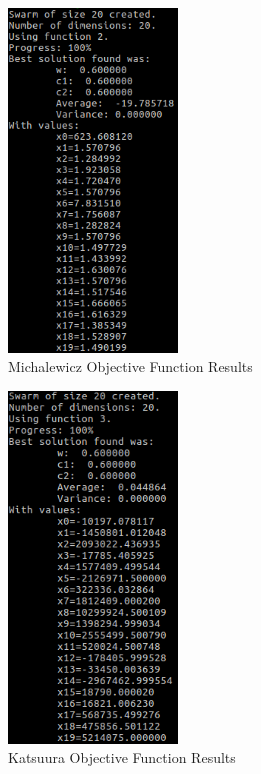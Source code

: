\documentclass[hidelinks,english,conference]{IEEEtran}
\begin{document}
\begin{figure}[!h]\centering
	\includegraphics[width=4.5cm]{michalewicz_results.png}
	\caption{Michalewicz Objective Function Results}
\end{figure}
\begin{figure}[!h]\centering
	\includegraphics[width=4.5cm]{katsuura_results.png}
	\caption{Katsuura Objective Function Results}
\end{figure}
\end{document}

